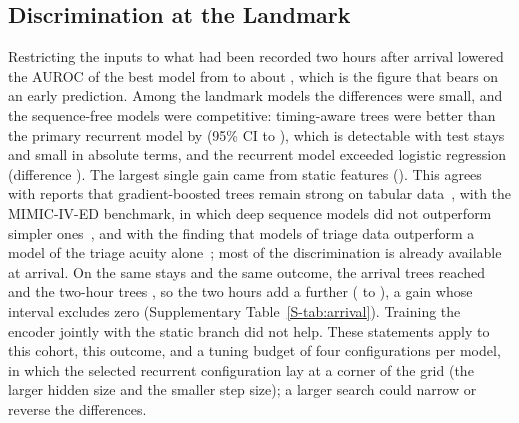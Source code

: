 \subsection{Discrimination at the Landmark}

Restricting the inputs to what had been recorded two hours after arrival lowered the AUROC of the best model from \RVEosHybridAuroc{} to about \RVAurocXgbT{}, which is
the figure that bears on an early prediction. Among the landmark models the differences were small, and the sequence-free models were competitive: timing-aware trees
were better than the primary recurrent model by \RVTreesOverHybrid{} (95\% CI \RVTreesOverHybridLo{} to \RVTreesOverHybridHi{}), which is detectable with
\RVHtwoTestEligible{} test stays and small in absolute terms, and the recurrent model exceeded logistic regression (difference \RVCTwoDelta{}). The largest single gain came from
static features (\RVCThreeDelta{}). This agrees with reports that gradient-boosted trees remain strong on tabular data~\cite{grinsztajn2022treebased}, with the MIMIC-IV-ED benchmark, in which deep sequence models did not outperform simpler ones~\cite{xie2022mimic4ed}, and with the
finding that models of triage data outperform a model of the triage acuity alone~\cite{raita2019triage}; most of the discrimination is
already available at arrival. On the same stays and the same outcome, the arrival trees reached \RVCommonArrTrees{} and the two-hour trees \RVCommonTwoTrees{}, so the two hours add a further \RVCommonTreesGainU{} (\RVCommonTreesGainULo{} to \RVCommonTreesGainUHi{}), a gain whose interval excludes zero (Supplementary Table~\ref{S-tab:arrival}). Training the encoder jointly with the static branch did not help. These statements apply to
this cohort, this outcome, and a tuning budget of four configurations per model, in which the selected recurrent configuration lay at a corner of the grid (the larger
hidden size and the smaller step size); a larger search could narrow or reverse the differences.

